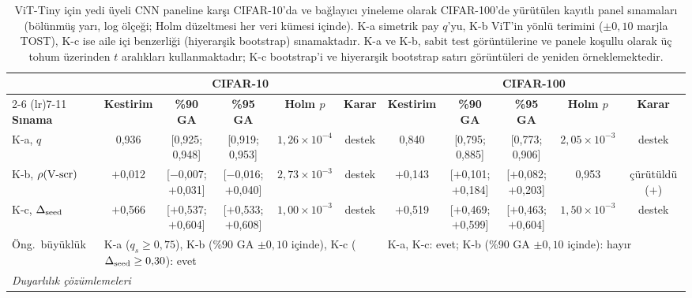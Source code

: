 \begin{table}[!t]
\centering
\caption{ViT-Tiny için yedi üyeli CNN paneline karşı CIFAR-10'da ve bağlayıcı yineleme olarak CIFAR-100'de yürütülen kayıtlı panel sınamaları (bölünmüş yarı, log ölçeği; Holm düzeltmesi her veri kümesi içinde). K-a simetrik pay $q$'yu, K-b ViT'in yönlü terimini ($\pm0{,}10$ marjla TOST), K-c ise aile içi benzerliği (hiyerarşik bootstrap) sınamaktadır. K-a ve K-b, sabit test görüntülerine ve panele koşullu olarak üç tohum üzerinden $t$ aralıkları kullanmaktadır; K-c bootstrap'i ve hiyerarşik bootstrap satırı görüntüleri de yeniden örneklemektedir.}
\label{tab:panel_tests}
\scriptsize
\setlength{\tabcolsep}{1.6pt}
\begin{tabular}{lcccccccccc}
\toprule
& \multicolumn{5}{c}{\textbf{CIFAR-10}} & \multicolumn{5}{c}{\textbf{CIFAR-100}} \\
\cmidrule(lr){2-6} \cmidrule(lr){7-11}
\textbf{Sınama} & \textbf{Kestirim} & \textbf{\%90 GA} & \textbf{\%95 GA} & \textbf{Holm $p$} & \textbf{Karar} & \textbf{Kestirim} & \textbf{\%90 GA} & \textbf{\%95 GA} & \textbf{Holm $p$} & \textbf{Karar} \\
\midrule
K-a, $q$ & 0,936 & [0,925; 0,948] & [0,919; 0,953] & $1{,}26\times10^{-4}$ & destek & 0,840 & [0,795; 0,885] & [0,773; 0,906] & $2{,}05\times10^{-3}$ & destek \\
K-b, $\rho(\mbox{V-scr})$ & $+$0,012 & [$-$0,007; $+$0,031] & [$-$0,016; $+$0,040] & $2{,}73\times10^{-3}$ & destek & $+$0,143 & [$+$0,101; $+$0,184] & [$+$0,082; $+$0,203] & 0,953 & çürütüldü ($+$) \\
K-c, $\Delta_{\mathrm{seed}}$ & $+$0,566 & [$+$0,537; $+$0,604] & [$+$0,533; $+$0,608] & $1{,}00\times10^{-3}$ & destek & $+$0,519 & [$+$0,469; $+$0,599] & [$+$0,463; $+$0,604] & $1{,}50\times10^{-3}$ & destek \\
Öng.\ büyüklük & \multicolumn{5}{l}{K-a ($q_s \geq 0{,}75$), K-b (\%90 GA $\pm0{,}10$ içinde), K-c ($\Delta_{\mathrm{seed}} \geq 0{,}30$): evet}
 & \multicolumn{5}{l}{K-a, K-c: evet; K-b (\%90 GA $\pm0{,}10$ içinde): hayır} \\
\midrule
\multicolumn{11}{l}{\textit{Duyarlılık çözümlemeleri}} \\

\end{tabular}
\end{table}
